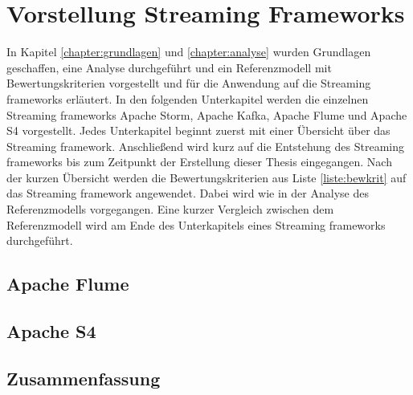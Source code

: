 \chapter{Vorstellung Streaming Frameworks}
\label{chapter:vorstellung}

In Kapitel \ref{chapter:grundlagen} und \ref{chapter:analyse} wurden Grundlagen geschaffen, eine Analyse durchgeführt und ein Referenzmodell mit Bewertungskriterien vorgestellt und für die Anwendung auf die Streaming frameworks erläutert. In den folgenden Unterkapitel werden die einzelnen Streaming frameworks Apache Storm, Apache Kafka, Apache Flume und Apache S4 vorgestellt. Jedes Unterkapitel beginnt zuerst mit einer Übersicht über das Streaming framework. Anschließend wird kurz auf die Entstehung des Streaming frameworks bis zum Zeitpunkt der Erstellung dieser Thesis eingegangen. Nach der kurzen Übersicht werden die Bewertungskriterien aus Liste \ref{liste:bewkrit} auf das Streaming framework angewendet. Dabei wird wie in der Analyse des Referenzmodells vorgegangen. Eine kurzer Vergleich zwischen dem Referenzmodell wird am Ende des Unterkapitels eines Streaming frameworks durchgeführt.





\section{Apache Flume}
\section{Apache S4}
\section{Zusammenfassung}